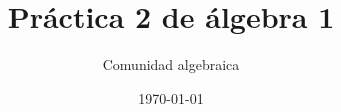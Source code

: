 

\usetikzlibrary{external,angles,quotes}



\def\V{\text{ verdadera }}
\def\eq?{\stackrel{\text{?}}}
\def\eqHI{\stackrel{\text{HI}}}
\def\eqDef{\stackrel{\text{def}}}



\pagestyle{empty} %

\title{Práctica 2 de álgebra 1} %
\author{Comunidad algebraica} %
\date{\today} %



